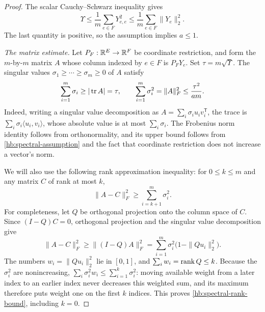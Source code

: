 \begin{proof}
The scalar Cauchy--Schwarz inequality gives
\[
 \Upsilon\le\frac1m\sum_{e\in F}Y_{e,e}^2
 \le\frac1m\sum_{e\in F}\|Y_e\|_2^2.
\]
The last quantity is positive, so the assumption implies \(a\le1\).

\smallskip
\noindent\emph{The matrix estimate.}
Let \(P_F:\mathbb R^E\to\mathbb R^F\) be coordinate restriction, and form the
\(m\)-by-\(m\) matrix \(A\) whose column indexed by \(e\in F\)
is \(P_FY_e\).  Set \(\tau=m\sqrt\Upsilon\).
The singular values \(\sigma_1\ge\cdots\ge\sigma_m\ge0\) of \(A\)
satisfy
\begin{equation}\label{hb:spectral-matrix-bounds}
 \sum_{i=1}^m\sigma_i\ge|\operatorname{tr} A|=\tau,
 \qquad
 \sum_{i=1}^m\sigma_i^2=\|A\|_F^2
 \le\frac{\tau^2}{am}.
\end{equation}
Indeed, writing a singular value decomposition as
\(A=\sum_i\sigma_i u_i v_i^{\mathsf T}\), the trace is
\(\sum_i\sigma_i\langle u_i,v_i\rangle\), whose absolute value
is at most \(\sum_i\sigma_i\).  The Frobenius norm identity follows
from orthonormality, and its upper bound follows from
\eqref{hb:spectral-assumption} and the fact that coordinate restriction
does not increase a vector's norm.

We will also use the following rank approximation inequality:
for \(0\le k\le m\) and any matrix \(C\) of rank at most \(k\),
\begin{equation}\label{hb:spectral-rank-bound}
 \|A-C\|_F^2\ge\sum_{i=k+1}^m\sigma_i^2.
\end{equation}
For completeness, let \(Q\) be orthogonal projection onto the column
space of \(C\).  Since \((I-Q)C=0\), orthogonal projection and the
singular value decomposition give
\[
 \|A-C\|_F^2
 \ge\|(I-Q)A\|_F^2
 =\sum_{i=1}^m\sigma_i^2\bigl(1-\|Qu_i\|_2^2\bigr).
\]
The numbers \(w_i=\|Qu_i\|_2^2\) lie in \([0,1]\), and
\(\sum_iw_i=\operatorname{rank} Q\le k\).
Because the \(\sigma_i^2\) are nonincreasing,
\(\sum_i\sigma_i^2w_i\le\sum_{i=1}^k\sigma_i^2\):
moving available weight from a later index to an earlier index never
decreases this weighted sum, and its maximum therefore puts weight one
on the first \(k\) indices.  This proves
\eqref{hb:spectral-rank-bound}, including \(k=0\).


\end{proof}
